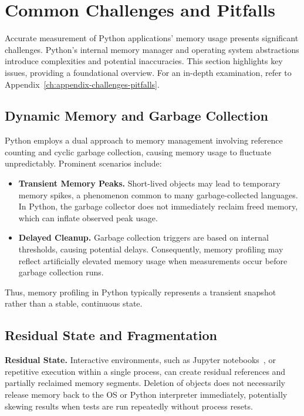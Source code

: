 \section{Common Challenges and Pitfalls}
\label{sec:mmc-common-challenges-and-pitfalls}

Accurate measurement of Python applications' memory usage presents significant challenges.
Python's internal memory manager and operating system abstractions introduce complexities and potential inaccuracies.
This section highlights key issues, providing a foundational overview.
For an in-depth examination, refer to Appendix~\ref{ch:appendix-challenges-pitfalls}.

\subsection{Dynamic Memory and Garbage Collection}
\label{subsec:mmc-challenges-gc}

Python employs a dual approach to memory management involving reference counting and cyclic garbage collection, causing memory usage to fluctuate unpredictably.
Prominent scenarios include:

\begin{itemize}
    \item \textbf{Transient Memory Peaks.} Short-lived objects may lead to temporary memory spikes, a phenomenon common to many garbage-collected languages. In Python, the garbage collector does not immediately reclaim freed memory, which can inflate observed peak usage.
    \item \textbf{Delayed Cleanup.} Garbage collection triggers are based on internal thresholds, causing potential delays. Consequently, memory profiling may reflect artificially elevated memory usage when measurements occur before garbage collection runs.
\end{itemize}

Thus, memory profiling in Python typically represents a transient snapshot rather than a stable, continuous state.

\subsection{Residual State and Fragmentation}
\label{subsec:mmc-challenges-fragmentation}

\textbf{Residual State.} Interactive environments, such as Jupyter notebooks~\cite{kluyver2016jupyter}, or repetitive execution within a single process, can create residual references and partially reclaimed memory segments.
Deletion of objects does not necessarily release memory back to the \ac{OS} or Python interpreter immediately, potentially skewing results when tests are run repeatedly without process resets.

